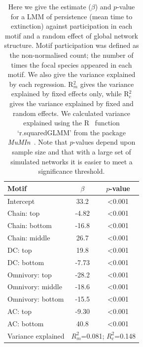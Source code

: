 \documentclass[12pt]{article}
\begin{document}
\begin{spacing}{2.0}
		\begin{table}[hb!]
    		\caption{Here we give the estimate ($\beta$) and $p$-value for a LMM of persistence (mean time to extinction) against participation in each motif and a random effect of global network structure. Motif participation was defined as the non-normalised count; the number of times the focal species appeared in each motif. We also give the variance explained by each regression. R$^{2}_{m}$ gives the variance explained by fixed effects only, while R$^{2}_{c}$ gives the variance explained by fixed and random effects. We calculated variance explained using the R~\citep{R} function `r.squaredGLMM' from the package \emph{MuMIn}~\citep{MuMIn}. Note that $p$-values depend upon sample size and that with a large set of simulated networks it is easier to meet a significance threshold.}
    		\label{tab:freq_positions}
    		\begin{tabular}{l | c c}
    		Motif & $\beta$ & $p$-value \\  
    		\hline
            Intercept	&	33.2	&	\textless0.001	\\
            Chain: top	&	-4.82	&	\textless0.001	\\
            Chain: bottom	&	-16.8	&	\textless0.001	\\
            Chain: middle	&	26.7	&	\textless0.001	\\
            DC: top	&	19.8	&	\textless0.001	\\
            DC: bottom	&	-7.73	&	\textless0.001	\\
            Omnivory: top	&	-28.2	&	\textless0.001	\\
            Omnivory: middle	&	-18.6	&	\textless0.001	\\
            Omnivory: bottom	&	-15.5	&	\textless0.001	\\
            AC: top	&	-9.30	&	\textless0.001	\\
            AC: bottom	&	40.8	&	\textless0.001	\\
            \hline
    		Variance explained & \multicolumn{2}{c}{$R^{2}_m$=0.081; $R^2_c$=0.148} \\
    		\hline
    		\end{tabular}
    		\end{table}


\end{spacing}
\end{document}
